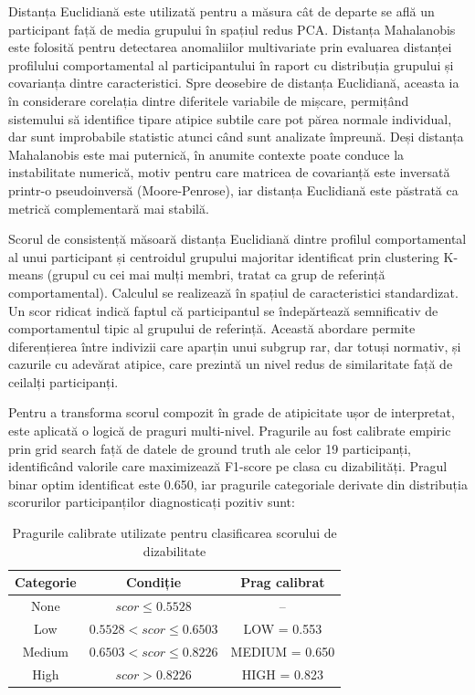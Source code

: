 \documentclass[12pt,a4paper]{report}
\theoremstyle{definition}
\theoremstyle{remark}
\begin{document}
Distanța Euclidiană este utilizată pentru a măsura cât de departe se află un participant față de media grupului în spațiul redus PCA. Distanța Mahalanobis este folosită pentru detectarea anomaliilor multivariate prin evaluarea distanței profilului comportamental al participantului în raport cu distribuția grupului și covarianța dintre caracteristici. Spre deosebire de distanța Euclidiană, aceasta ia în considerare corelația dintre diferitele variabile de mișcare, permițând sistemului să identifice tipare atipice subtile care pot părea normale individual, dar sunt improbabile statistic atunci când sunt analizate împreună. Deși distanța Mahalanobis este mai puternică, în anumite contexte poate conduce la instabilitate numerică, motiv pentru care matricea de covarianță este inversată printr-o pseudoinversă (Moore-Penrose), iar distanța Euclidiană este păstrată ca metrică complementară mai stabilă.

Scorul de consistență măsoară distanța Euclidiană dintre profilul comportamental al unui participant și centroidul grupului majoritar identificat prin clustering K-means (grupul cu cei mai mulți membri, tratat ca grup de referință comportamental). Calculul se realizează în spațiul de caracteristici standardizat. Un scor ridicat indică faptul că participantul se îndepărtează semnificativ de comportamentul tipic al grupului de referință. Această abordare permite diferențierea între indivizii care aparțin unui subgrup rar, dar totuși normativ, și cazurile cu adevărat atipice, care prezintă un nivel redus de similaritate față de ceilalți participanți.

Pentru a transforma scorul compozit în grade de atipicitate ușor de interpretat, este aplicată o logică de praguri multi-nivel. Pragurile au fost calibrate empiric prin grid search față de datele de ground truth ale celor 19 participanți, identificând valorile care maximizează F1-score pe clasa cu dizabilități. Pragul binar optim identificat este 0.650, iar pragurile categoriale derivate din distribuția scorurilor participanților diagnosticați pozitiv sunt:

\begin{table}[H]
\centering
\caption{Pragurile calibrate utilizate pentru clasificarea scorului de dizabilitate}
\label{tab:praguri_dizabilitate}
\begin{tabular}{|c|c|c|}
\hline
\textbf{Categorie} & \textbf{Condiție} & \textbf{Prag calibrat} \\
\hline
None   & $scor \leq 0.5528$           & -- \\
\hline
Low    & $0.5528 < scor \leq 0.6503$   & LOW = 0.553 \\
\hline
Medium & $0.6503 < scor \leq 0.8226$   & MEDIUM = 0.650 \\
\hline
High   & $scor > 0.8226$              & HIGH = 0.823 \\
\hline
\end{tabular}
\end{table}
\end{document}
